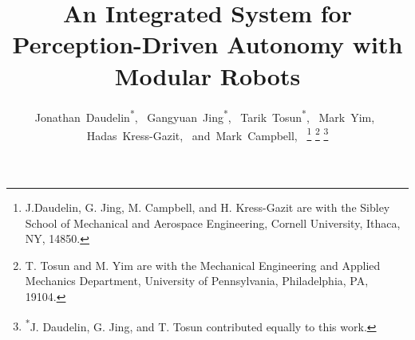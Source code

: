 \documentclass[journal]{IEEEtran}
\begin{document}

\title{An Integrated System for Perception-Driven Autonomy with Modular Robots}
\author{Jonathan~Daudelin\textsuperscript{*},~
        Gangyuan~Jing\textsuperscript{*},~
        Tarik~Tosun\textsuperscript{*},~
        Mark~Yim,~
        Hadas~Kress-Gazit,~
        and~Mark~Campbell,~%
\thanks{J.Daudelin, G. Jing, M. Campbell, and H. Kress-Gazit are with the Sibley School of Mechanical and Aerospace Engineering, Cornell University, Ithaca,
NY, 14850.}%
\thanks{T. Tosun and M. Yim are with the Mechanical Engineering and Applied Mechanics Department, University of Pennsylvania, Philadelphia, PA, 19104.}%
\thanks{\textsuperscript{*}J. Daudelin, G. Jing, and T. Tosun contributed equally to this work.}}


\maketitle
\end{document}

